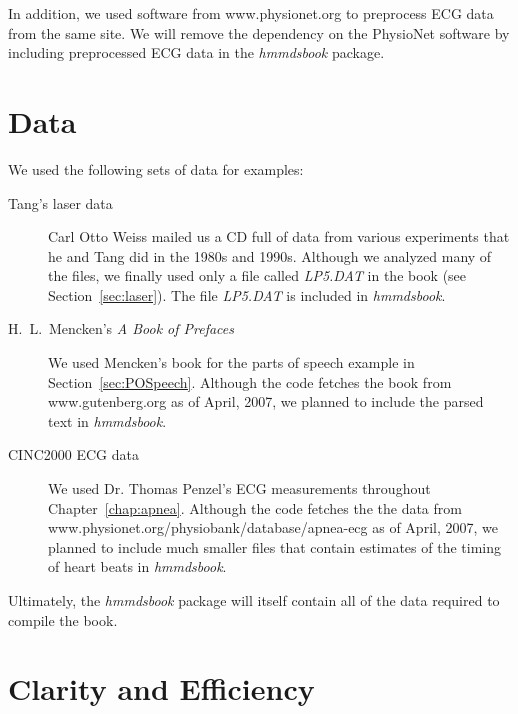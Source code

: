   In addition, we used software from www.physionet.org to preprocess
  ECG data from the same site.  We will remove the dependency on the
  PhysioNet software by including preprocessed ECG data in the
  \emph{hmmdsbook} package.

\section{Data}
\label{sec:SWdata}

We used the following sets of data for examples:
\begin{description}
\item[Tang's laser data] Carl Otto Weiss  mailed
  us a CD full of data from various experiments that he and Tang did
  in the 1980s and 1990s.  Although we analyzed many of the files, we
  finally used only a file called \emph{LP5.DAT} in the book (see
  Section~\ref{sec:laser}).  The file \emph{LP5.DAT} is included in
  \emph{hmmdsbook}.
\item[H.~L.~Mencken's \emph{A Book of Prefaces}] We used Mencken's
  book for the parts of speech example in Section~\ref{sec:POSpeech}.
  Although the code fetches the book from www.gutenberg.org as of
  April, 2007, we planned to include the parsed text in
  \emph{hmmdsbook}.
\item[CINC2000 ECG data] We used Dr. Thomas Penzel's ECG measurements
  throughout Chapter~\ref{chap:apnea}.  Although the code fetches the
  the data from\\
  www.physionet.org/physiobank/database/apnea-ecg as of April, 2007,
  we planned to include much smaller files that contain estimates of
  the timing of heart beats in \emph{hmmdsbook}.
\end{description}
Ultimately, the \emph{hmmdsbook} package will itself contain all of
the data required to compile the book.

\section{Clarity and Efficiency}
\label{sec:Clarity}


